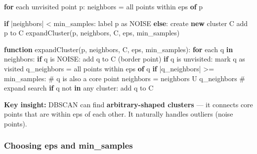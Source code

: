 \documentclass[11pt]{article}
\newenvironment{Shaded}{\begin{snugshade}}{\end{snugshade}}
\newcommand{\ControlFlowTok}[1]{\textcolor[rgb]{0.99,0.74,0.29}{\textbf{#1}}}
\newcommand{\FunctionTok}[1]{\textcolor[rgb]{0.56,0.27,0.68}{#1}}
\newcommand{\ImportTok}[1]{\textcolor[rgb]{0.15,0.68,0.38}{#1}}
\newcommand{\KeywordTok}[1]{\textcolor[rgb]{0.81,0.81,0.76}{\textbf{#1}}}
\newcommand{\NormalTok}[1]{\textcolor[rgb]{0.81,0.81,0.76}{#1}}
\newcommand{\OperatorTok}[1]{\textcolor[rgb]{0.81,0.81,0.76}{#1}}
\begin{document}
\begin{Shaded}
\begin{Highlighting}[]
\ControlFlowTok{for}\NormalTok{ each unvisited point p}\OperatorTok{:}
\NormalTok{    neighbors }\OperatorTok{=}\NormalTok{ all points within eps }\KeywordTok{of}\NormalTok{ p}
    
    \ControlFlowTok{if} \OperatorTok{|}\NormalTok{neighbors}\OperatorTok{|} \OperatorTok{\textless{}}\NormalTok{ min\_samples}\OperatorTok{:}
\NormalTok{        label p }\ImportTok{as}\NormalTok{ NOISE}
    \ControlFlowTok{else}\OperatorTok{:}
\NormalTok{        create }\KeywordTok{new}\NormalTok{ cluster C}
\NormalTok{        add p to C}
        \FunctionTok{expandCluster}\NormalTok{(p}\OperatorTok{,}\NormalTok{ neighbors}\OperatorTok{,}\NormalTok{ C}\OperatorTok{,}\NormalTok{ eps}\OperatorTok{,}\NormalTok{ min\_samples)}

\KeywordTok{function} \FunctionTok{expandCluster}\NormalTok{(p}\OperatorTok{,}\NormalTok{ neighbors}\OperatorTok{,}\NormalTok{ C}\OperatorTok{,}\NormalTok{ eps}\OperatorTok{,}\NormalTok{ min\_samples)}\OperatorTok{:}
    \ControlFlowTok{for}\NormalTok{ each q }\KeywordTok{in}\NormalTok{ neighbors}\OperatorTok{:}
        \ControlFlowTok{if}\NormalTok{ q is NOISE}\OperatorTok{:}\NormalTok{ add q to }\FunctionTok{C}\NormalTok{ (border point)}
        \ControlFlowTok{if}\NormalTok{ q is unvisited}\OperatorTok{:}
\NormalTok{            mark q }\ImportTok{as}\NormalTok{ visited}
\NormalTok{            q\_neighbors }\OperatorTok{=}\NormalTok{ all points within eps }\KeywordTok{of}\NormalTok{ q}
            \ControlFlowTok{if} \OperatorTok{|}\NormalTok{q\_neighbors}\OperatorTok{|} \OperatorTok{\textgreater{}=}\NormalTok{ min\_samples}\OperatorTok{:}\NormalTok{  \# q is also a core point}
\NormalTok{                neighbors }\OperatorTok{=}\NormalTok{ neighbors U q\_neighbors  \# expand search}
            \ControlFlowTok{if}\NormalTok{ q not }\KeywordTok{in}\NormalTok{ any cluster}\OperatorTok{:}
\NormalTok{                add q to C}
\end{Highlighting}
\end{Shaded}

\textbf{Key insight:} DBSCAN can find \textbf{arbitrary-shaped clusters} --- it connects core points that are within eps of each other. It naturally handles outliers (noise points).

\subsubsection{Choosing eps and min\_samples}\label{choosing-eps-and-min_samples}
\end{document}
